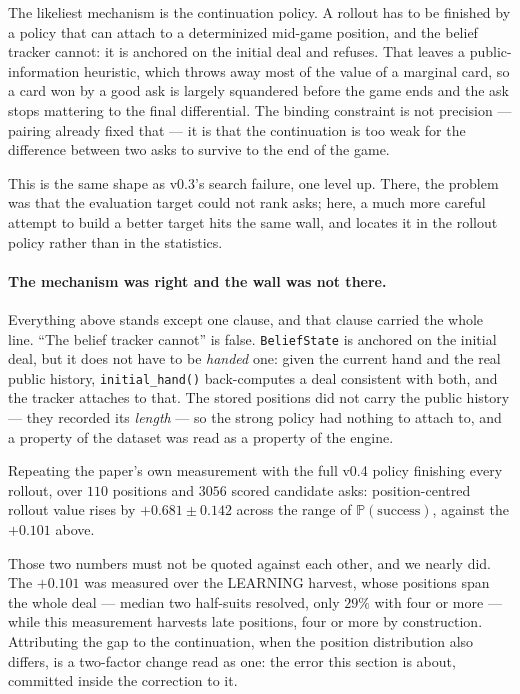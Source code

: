 \documentclass[11pt,a4paper]{article}
\newcommand{\Prob}{\ensuremath{\mathbb{P}}}
\begin{document}
The likeliest mechanism is the continuation policy. A rollout has to be finished
by a policy that can attach to a determinized mid-game position, and the
belief tracker cannot: it is anchored on the initial deal and refuses. That
leaves a public-information heuristic, which throws away most of the value of a
marginal card, so a card won by a good ask is largely squandered before the game
ends and the ask stops mattering to the final differential. The binding
constraint is not precision --- pairing already fixed that --- it is that the
continuation is too weak for the difference between two asks to survive to the
end of the game.

This is the same shape as v0.3's search failure, one level up. There, the
problem was that the evaluation target could not rank asks; here, a much more
careful attempt to build a better target hits the same wall, and locates it in
the rollout policy rather than in the statistics.

\paragraph{The mechanism was right and the wall was not there.} Everything above
stands except one clause, and that clause carried the whole line. ``The belief
tracker cannot'' is false. \texttt{BeliefState} is anchored on the initial deal,
but it does not have to be \emph{handed} one: given the current hand and the
real public history, \texttt{initial\_hand()} back-computes a deal consistent
with both, and the tracker attaches to that. The stored positions did not carry
the public history --- they recorded its \emph{length} --- so the strong policy
had nothing to attach to, and a property of the dataset was read as a property
of the engine.

Repeating the paper's own measurement with the full v0.4 policy finishing every
rollout, over $110$ positions and $3056$ scored candidate asks: position-centred
rollout value rises by $+0.681 \pm 0.142$ across the range of
$\Prob(\text{success})$, against the $+0.101$ above.

Those two numbers must not be quoted against each other, and we nearly did. The
$+0.101$ was measured over the LEARNING harvest, whose positions span the whole
deal --- median two half-suits resolved, only $29\%$ with four or more --- while
this measurement harvests late positions, four or more by construction.
Attributing the gap to the continuation, when the position distribution also
differs, is a two-factor change read as one: the error this section is about,
committed inside the correction to it.
\end{document}
